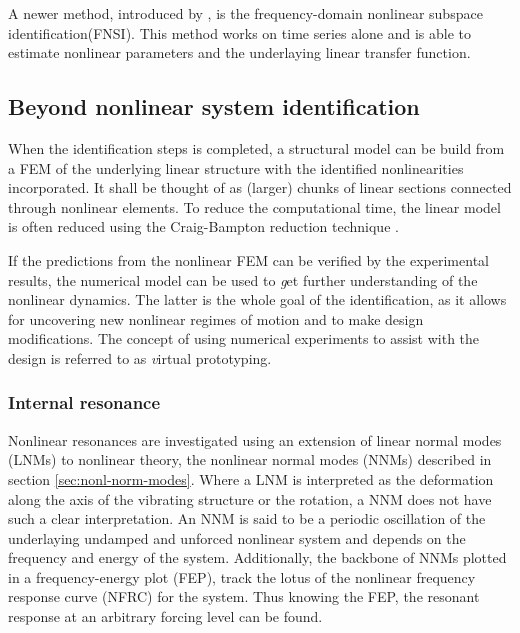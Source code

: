A newer method, introduced by \textcite{noel2013a}, is the frequency-domain
nonlinear subspace identification(FNSI). This method works on
time series alone and is able to estimate nonlinear parameters and the
underlaying linear transfer function.






\subsection{Beyond nonlinear system identification}
\label{sec:beyond-nonl-syst}

When the identification steps is completed, a structural model can be build from
a FEM of the underlying linear structure with the identified nonlinearities
incorporated. It shall be thought of as (larger) chunks of linear sections
connected through nonlinear elements. To reduce the computational time, the
linear model is often reduced using the Craig-Bampton reduction technique
\autocite{craig1968a}.

If the predictions from the nonlinear FEM can be verified by the
experimental results, the numerical model can be used to {\textit get further
  understanding of the nonlinear dynamics}. The latter is the whole goal of the
identification, as it allows for uncovering new nonlinear regimes of motion and
to make design modifications. The concept of using numerical experiments to
assist with the design is referred to as {\textit virtual prototyping}.


\subsubsection{Internal resonance}
\label{sec:internal-resonance}


Nonlinear resonances are investigated using an extension of linear normal modes
(LNMs) to nonlinear theory, the nonlinear normal modes (NNMs) described in
section \ref{sec:nonl-norm-modes}.
Where a LNM is interpreted as the deformation along the axis of the vibrating
structure or the rotation, a NNM does not have such a clear interpretation.
An NNM is said to be a periodic oscillation of the underlaying undamped and
unforced nonlinear system and depends on the frequency and energy of the
system. Additionally, the backbone of NNMs plotted in a frequency-energy plot
(FEP), track the lotus of the nonlinear frequency response curve (NFRC) for
the system. Thus knowing the FEP, the resonant response at an arbitrary forcing
level can be found.


